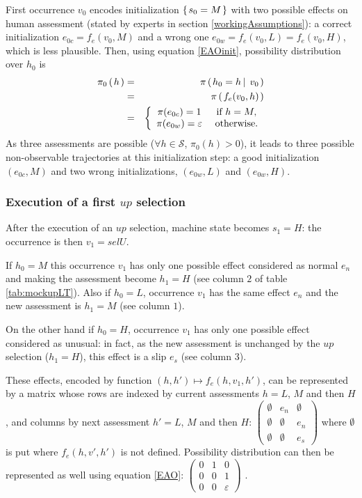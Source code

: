 First occurrence $v_0$ encodes initialization $\left\{ \left.  s_0 = M  \right. \right\}$ 
with two possible effects on human assessment
(stated by experts in section \ref{workingAssumptions}): 
a correct initialization $e_{0c} = f_{e}(v_0, M)$ 
and a wrong one $e_{0w} = f_{e}(v_0,L) = f_{e}(v_0,H)$, 
which is less plausible. 
Then, using equation \ref{EAOinit}, possibility distribution over $h_0$ is
\begin{eqnarray*}
\pi_0 \left( \left.  h  \right. \right) & = & \pi \left( \left.  h_0 = h \, \right| \left. \, v_0  \right. \right) \\
& = &  \pi \left( \left.  f_{e}(v_0,h)  \right. \right) \\
& = &  \left \{ \begin{array}{ccc}  
    \pi (e_{0c}) = 1 & \mbox{ if } h=M, \\
    \pi (e_{0w}) = \varepsilon & \mbox{ otherwise}.
\end{array} \right. 
\end{eqnarray*}
As three assessments are possible ($\forall h \in \mathcal{S}$, $\pi_0(h)>0$), 
it leads to three possible non-observable 
trajectories at this initialization step: a good initialization $(e_{0c},M)$ 
and two wrong initializations, $(e_{0w},L)$ and $(e_{0w},H)$.

\subsubsection{Execution of a first $up$ selection} 
After the execution of an $up$ selection, machine state becomes $s_1=H$:
the occurrence is then $v_1 = selU$.

If $h_0=M$ this occurrence $v_1$ 
has only one possible effect 
considered as normal $e_n$ 
and making the assessment become 
$h_1=H$ (see column $2$ of table \ref{tab:mockupLT}). 
Also if $h_0=L$, occurrence $v_1$ has the same 
effect $e_n$ and the new assessment is $h_1=M$ (see column $1$). 

On the other hand if $h_0=H$, 
occurrence $v_1$ has only one possible effect 
considered as unusual: 
in fact, as the new assessment 
is unchanged by the $up$ selection ($h_1=H$), 
this effect is a slip $e_s$ (see column $3$). 
 
These effects, encoded by function $(h,h') \mapsto f_e(h,v_1,h')$,
can be represented 
by a matrix whose rows 
are indexed by current assessments $h=L$, $M$ and then $H$, 
and columns by next assessment $h'=L$, $M$ and then $H$:
\tiny
$\begin{pmatrix}
\emptyset & e_n & \emptyset  \\
\emptyset & \emptyset & e_n \\
\emptyset & \emptyset  & e_s 
\end{pmatrix}$
\normalsize where $\emptyset$ is put where
$f_e(h,v',h')$ is not defined. 
Possibility distribution can then be represented as well 
using equation \ref{EAO}:
\tiny
$\begin{pmatrix}
0 & 1 & 0 \\
0 & 0 & 1 \\
0 & 0 & \varepsilon 
\end{pmatrix} $
\normalsize.\\

